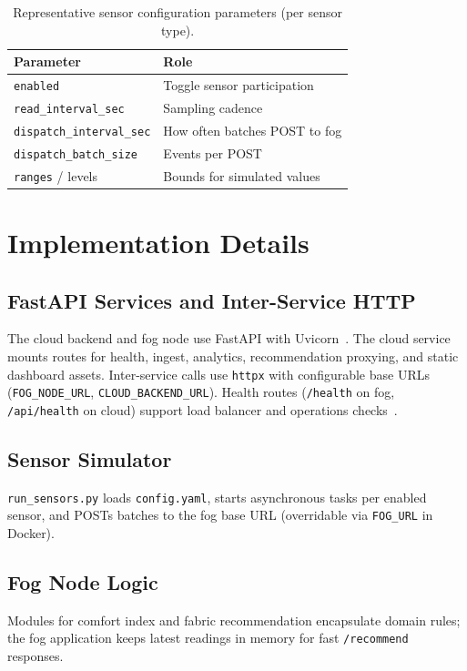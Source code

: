 \documentclass[conference]{IEEEtran}
\begin{document}
\begin{table}[htbp]
\centering
\caption{Representative sensor configuration parameters (per sensor type).}
\label{tab:sensorcfg}
\begin{tabular}{@{}ll@{}}
\toprule
\textbf{Parameter} & \textbf{Role} \\
\midrule
\texttt{enabled} & Toggle sensor participation \\
\texttt{read\_interval\_sec} & Sampling cadence \\
\texttt{dispatch\_interval\_sec} & How often batches POST to fog \\
\texttt{dispatch\_batch\_size} & Events per POST \\
\texttt{ranges} / levels & Bounds for simulated values \\
\bottomrule
\end{tabular}
\end{table}

\section{Implementation Details}

\subsection{FastAPI Services and Inter-Service HTTP}
The cloud backend and fog node use FastAPI with Uvicorn~\cite{fastapi}. The cloud service mounts routes for health, ingest, analytics, recommendation proxying, and static dashboard assets. Inter-service calls use \texttt{httpx} with configurable base URLs (\texttt{FOG\_NODE\_URL}, \texttt{CLOUD\_BACKEND\_URL}). Health routes (\texttt{/health} on fog, \texttt{/api/health} on cloud) support load balancer and operations checks~\cite{ecs}.

\subsection{Sensor Simulator}
\texttt{run\_sensors.py} loads \texttt{config.yaml}, starts asynchronous tasks per enabled sensor, and POSTs batches to the fog base URL (overridable via \texttt{FOG\_URL} in Docker).

\subsection{Fog Node Logic}
Modules for comfort index and fabric recommendation encapsulate domain rules; the fog application keeps latest readings in memory for fast \texttt{/recommend} responses.
\end{document}

